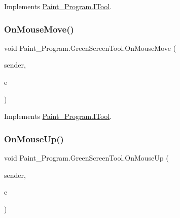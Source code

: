 Implements \mbox{\hyperlink{interface_paint___program_1_1_i_tool_a73d8797f4f2b1e0d8efe8aadcd44e840}{Paint\+\_\+\+Program.\+I\+Tool}}.

\mbox{\label{class_paint___program_1_1_green_screen_tool_a95699606ba5027c0671f4bc6ef86be93}} 
\subsubsection{\texorpdfstring{On\+Mouse\+Move()}{OnMouseMove()}}
{\footnotesize\ttfamily void Paint\+\_\+\+Program.\+Green\+Screen\+Tool.\+On\+Mouse\+Move (\begin{DoxyParamCaption}\item[{object}]{sender,  }\item[{Mouse\+Event\+Args}]{e }\end{DoxyParamCaption})\hspace{0.3cm}{\ttfamily [inline]}}



Implements \mbox{\hyperlink{interface_paint___program_1_1_i_tool_a6a1cbe840b5cfc8a9b9463cc21590845}{Paint\+\_\+\+Program.\+I\+Tool}}.

\mbox{\label{class_paint___program_1_1_green_screen_tool_ad6be969ae981c34f5677e8a5bd537ef6}} 
\subsubsection{\texorpdfstring{On\+Mouse\+Up()}{OnMouseUp()}}
{\footnotesize\ttfamily void Paint\+\_\+\+Program.\+Green\+Screen\+Tool.\+On\+Mouse\+Up (\begin{DoxyParamCaption}\item[{object}]{sender,  }\item[{Mouse\+Event\+Args}]{e }\end{DoxyParamCaption})\hspace{0.3cm}{\ttfamily [inline]}}



